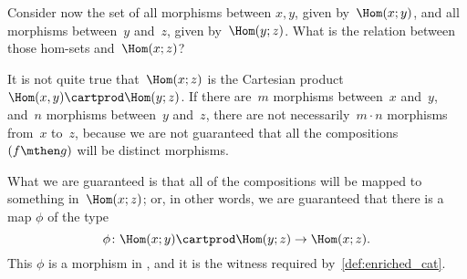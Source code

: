 {\begin{example}
        Consider now the set of all morphisms between $x, y$, given by~$\Hom(x;y)$, and all morphisms between~$y$ and~$z$, given by~$\Hom(y; z)$.
        What is the relation between those hom-sets and~$\Hom(x; z)$?

        It is not quite true that~$\Hom(x; z)$ is the Cartesian product~$\Hom(x, y) \cartprod \Hom(y; z)$.
        If there are~$m$ morphisms between~$x$ and~$y$, and~$n$ morphisms between~$y$ and~$z$, there are not necessarily~$m \cdot n$ morphisms from~$x$ to~$z$, because we are not guaranteed that all the compositions~$(f\mthen g)$ will be distinct morphisms.

        What we are guaranteed is that all of the compositions will be mapped to something in~$\Hom(x; z)$; or, in other words, we are guaranteed that there is a map $\phi$ of the type
        \begin{equation}
            \phi \colon \Hom(x; y) \cartprod \Hom(y; z) \rightarrow \Hom(x; z).
        \end{equation}
        This $\phi$ is a morphism in \Set, and it is the witness required by~\cref{def:enriched_cat}.

    \end{example}
}

